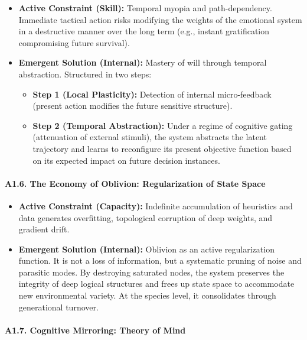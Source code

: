 \documentclass[11pt,a4paper,oneside]{article} %
\providecommand{\tightlist}{%
  \setlength{\itemsep}{0pt}\setlength{\parskip}{0pt}}
\begin{document}
\begin{itemize}
\tightlist
\item
  \textbf{Active Constraint (Skill):} Temporal myopia and
  path-dependency. Immediate tactical action risks modifying the weights
  of the emotional system in a destructive manner over the long term
  (e.g., instant gratification compromising future survival).
\item
  \textbf{Emergent Solution (Internal):} Mastery of will through
  temporal abstraction. Structured in two steps:

  \begin{itemize}
  \tightlist
  \item
    \textbf{Step 1 (Local Plasticity):} Detection of internal
    micro-feedback (present action modifies the future sensitive
    structure).
  \item
    \textbf{Step 2 (Temporal Abstraction):} Under a regime of cognitive
    gating (attenuation of external stimuli), the system abstracts the
    latent trajectory and learns to reconfigure its present objective
    function based on its expected impact on future decision instances.
  \end{itemize}
\end{itemize}

\hypertarget{a1.6.-the-economy-of-oblivion-regularization-of-state-space}{%
\paragraph{A1.6. The Economy of Oblivion: Regularization of State
Space}\label{a1.6.-the-economy-of-oblivion-regularization-of-state-space}}

\begin{itemize}
\tightlist
\item
  \textbf{Active Constraint (Capacity):} Indefinite accumulation of
  heuristics and data generates overfitting, topological corruption of
  deep weights, and gradient drift.
\item
  \textbf{Emergent Solution (Internal):} Oblivion as an active
  regularization function. It is not a loss of information, but a
  systematic pruning of noise and parasitic modes. By destroying
  saturated nodes, the system preserves the integrity of deep logical
  structures and frees up state space to accommodate new environmental
  variety. At the species level, it consolidates through generational
  turnover.
\end{itemize}

\hypertarget{a1.7.-cognitive-mirroring-theory-of-mind}{%
\paragraph{A1.7. Cognitive Mirroring: Theory of
Mind}\label{a1.7.-cognitive-mirroring-theory-of-mind}}
\end{document}
